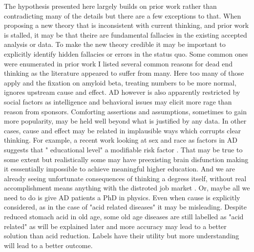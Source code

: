 The hypothesis presented here largely builds on prior
work rather than contradicting many of the details
but there are a few exceptions to that. 
When proposing a new theory 
that is inconsistent with current
thinking,  and prior work is stalled, 
it may be that theire are fundamental fallacies in the existing
accepted analysis or data.  To make the new theory credible it
may be important to explicitly identify hidden fallacies
or errors in the status quo. Some common ones were enumerated
in prior work \cite{marchywka-MJM-2024-010-0.01rg} I listed
several common reasons for dead end thinking as the literature appeared
to suffer from many.  Here too many of those apply and the fixation 
on amyloid beta, treating numbers to be more normal, ignores
upstream cause and effect. AD however is also apparently
restricted by social factors as intelligence and behavioral
issues may elicit more rage than reason from sponsors.
Comforting assertions and assumptions, sometimes to gain more
popularity, may be held well beyond what is justified by any data.
In other cases, cause and effect may be related in implausible
ways which corrupts clear thinking. For example, a recent work
looking at sex and race as factors in AD suggests that
" educational   level" a modifiable risk factor
\cite{Nianogo_RosenwohlMack_Yaffe_Risk_Factors_Associated_With_2022}.
That may be true to some extent but realistically some may 
have preexisting brain disfunction making it esssentially
impossible to achieve meaningful higher education. And we
are already seeing unfortunate consequences of thinking a
degress itself, without real accomplishment means anything with
the distroted job market
\cite{Eble_Hu_Signals_Information_}
\cite{Friedman_education_irony_when_2025}.
Or, maybe all we need to do is give AD patients a PhD in 
physics. 
Even when cause is explicitly considered, as
in the case of "acid related diseases" it may be misleading. 
Despite reduced stomach acid in old age, some old age
diseases are still labelled as "acid related"
as will be explained later and more accuracy may lead to a 
better solution than acid reduction. Labels have their utility but 
more understanding will lead to a better outcome.  


